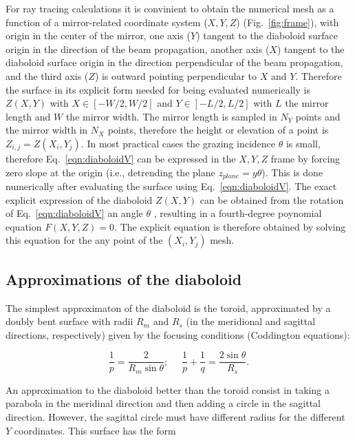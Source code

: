 \documentclass{iucr}              %
\begin{document}
For ray tracing calculations it is convinient to obtain the numerical mesh as a function of a mirror-related coordinate system ($X,Y,Z$) (Fig.~\ref{fig:frame}), with origin in the center of the mirror, one axis ($Y$) tangent to the diaboloid surface origin in the direction of the beam propagation, another axis ($X$) tangent to the diaboloid surface origin in the direction perpendicular of the beam propagation, and the third axis ($Z$) is outward pointing perpendicular to $X$ and $Y$. Therefore the surface in its explicit form needed for being evaluated numerically is $Z(X,Y)$ with $X \in [-W/2, W/2]$ and $Y \in [-L/2, L/2]$ with $L$ the mirror length and $W$ the mirror width. The mirror length is sampled in $N_Y$ points and the mirror width in $N_X$ points, therefore the height or elevation of a point is $Z_{i,j}=Z(X_i,Y_j)$.
In most practical cases the grazing incidence $\theta$ is small, therefore Eq.~\ref{eqn:diaboloidV} can be expressed in the $X,Y,Z$ frame by forcing zero slope at the origin (i.e., detrending the plane $z_{plane}=y \theta$). This is done numerically after evaluating the surface using Eq.~\ref{eqn:diaboloidV}. 
The exact explicit expression of the diaboloid $Z(X,Y)$ can be obtained from the rotation of Eq.~\ref{eqn:diaboloidV} an angle $\theta$ \cite{part2}, resulting in a fourth-degree poynomial equation $F(X,Y,Z)=0$. The explicit equation is therefore obtained by solving this equation for the any point of the $(X_i,Y_j)$ mesh.



\subsection{Approximations of the diaboloid}\label{sec:approximations}

The simplest approximaton of the diaboloid is the toroid, approximated by a doubly bent surface with radii $R_m$ and $R_s$ (in the meridional and sagittal directions, respectively) given by the focusing conditions (Coddington equations):

\begin{equation}
\label{eqn:radii}
\frac{1}{p} = \frac{2 }{R_m \sin\theta };~~~~~~
\frac{1}{p} + \frac{1}{q} = \frac{2\sin\theta}{ R_s}.
\end{equation}


An approximation to the diaboloid better than the toroid consist in taking a parabola in the meridinal direction and then adding a circle in the sagittal direction. However, the sagittal circle must have different radius for the different $Y$ coordinates. This surface has the form \cite{part2}
\end{document}
